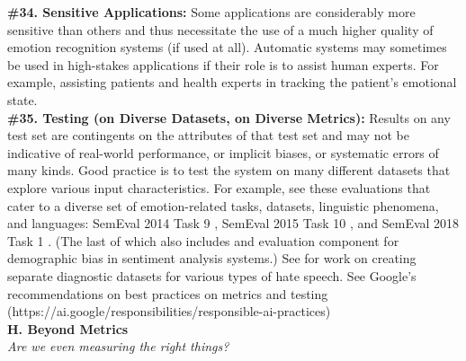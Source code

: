 \documentclass{clv3}
\begin{document}
\noindent \textbf{\#34. Sensitive Applications:} Some applications are considerably more sensitive than others and thus necessitate the use of a much higher quality of emotion recognition systems (if used at all). 
Automatic systems may sometimes be used in high-stakes applications if their role is to assist human experts. For example, assisting patients and health experts in tracking the patient’s emotional state.\\

\noindent \textbf{\#35. Testing (on Diverse Datasets, on Diverse Metrics):} Results on any test set are contingents on the attributes of that test set and may not be indicative of real-world performance, or implicit biases, or systematic errors of many kinds. Good practice is to test the system on many different datasets that explore various input characteristics. For example, see these evaluations that cater to a diverse set of emotion-related tasks, datasets, linguistic phenomena, and languages: SemEval 2014 Task 9 \cite{rosenthal-etal-2014-semeval}, SemEval 2015 Task 10 \cite{rosenthal-etal-2015-semeval}, and SemEval 2018 Task 1 \cite{mohammad-etal-2018-semeval}. (The last of which also includes and evaluation component for demographic bias in sentiment analysis systems.)
See \citet{rottger2020hatecheck} for work on creating separate diagnostic datasets for various types of hate speech.
See Google’s recommendations on best practices on metrics and testing (https://ai.google/responsibilities/responsible-ai-practices)\\ %

\noindent \textbf{H. Beyond Metrics}\\[2pt]
\noindent \textit{Are we even measuring the right things?}\\[-3pt]
\end{document}
